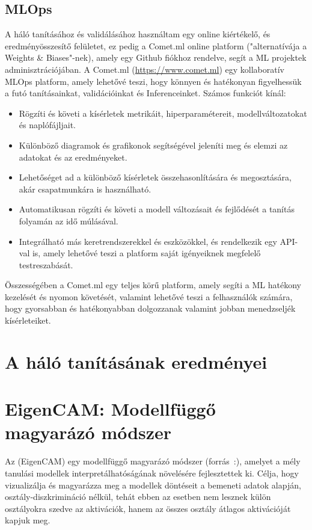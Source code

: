 \documentclass[12pt,oneside,a4paper]{article}
\newcommand{\newsection}[1]{\clearpage\section{#1}}\label{makro}
\theoremstyle{remark}
\begin{document}
	\subsection{MLOps}\label{subsec:MLOps}
	A háló tanításához és validálásához használtam egy online kiértékelő, és eredményösszesítő felületet, ez pedig a Comet.ml online platform ("alternatívája a Weights \& Biases"-nek), amely egy Github fiókhoz rendelve, segít a \ac{ML} projektek adminisztrációjában.
	A Comet.ml (\url{https://www.comet.ml}) egy kollaboratív \ac{MLOps} platform, amely lehetővé teszi, hogy könnyen és
	hatékonyan figyelhessük a futó tanításainkat, validációinkat és \gls{Inference}inket.
	Számos funkciót kínál:
	\begin{itemize}
		\item Rögzíti és követi a kísérletek metrikáit, hiperparamétereit, modellváltozatokat és naplófájljait.
		\item Különböző diagramok és grafikonok segítségével jeleníti meg és elemzi az adatokat és az eredményeket.
		\item Lehetőséget ad a különböző kísérletek összehasonlítására és megosztására, akár csapatmunkára is használható.
		\item Automatikusan rögzíti és követi a modell változásait és fejlődését a tanítás folyamán az idő múlásával.
		\item Integrálható más keretrendszerekkel és eszközökkel, és rendelkezik egy API-val is, amely lehetővé teszi a platform
		saját igényeiknek megfelelő testreszabását.
	\end{itemize}
	Összességében a Comet.ml egy teljes körű platform, amely segíti a \ac{ML} hatékony kezelését
	és nyomon követését, valamint lehetővé teszi a felhasználók számára, hogy gyorsabban és hatékonyabban dolgozzanak
	valamint jobban menedzseljék kísérleteiket.
	
	
	\newsection{A háló tanításának eredményei}\label{sec:haloperformancia}
	
	
	
	
	
	\newsection{EigenCAM: Modellfüggő magyarázó módszer}\label{sec:eigencam:-modellfuggo-magyarazo}
	Az  (\gls{EigenCAM}) egy modellfüggő magyarázó módszer (forrás~\cite{pytorch-grad-cam}:), amelyet a mély tanulási
	modellek interpretálhatóságának növelésére fejlesztettek ki.
	Célja, hogy vizualizálja és magyarázza meg a modellek döntéseit a bemeneti adatok alapján,
	osztály-diszkrimináció nélkül, tehát ebben az esetben nem lesznek külön osztályokra szedve az aktivációk, hanem az
	összes osztály átlagos aktivációját kapjuk meg.
	
\end{document}
